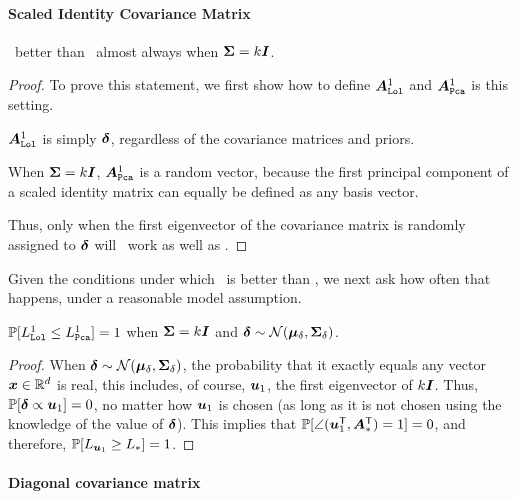 \documentclass[10pt]{article}
\begin{document}
\paragraph{Scaled Identity Covariance Matrix}


\begin{lem}
\Lol~better than \Pca~almost always when $\boldsymbol{\Sigma}=k \boldsymbol{I}$.
\end{lem}

\begin{proof}
To prove this statement, we first show how to define $\boldsymbol{A}_{{\sc \texttt{Lol}}}^1$ and $\boldsymbol{A}_{{\sc \texttt{Pca}}}^1$ is this setting.

\begin{compactitem}
\item $\boldsymbol{A}_{{\sc \texttt{Lol}}}^1$ is simply $\boldsymbol{\delta}$, regardless of the covariance matrices and priors.
\item When $\boldsymbol{\Sigma}=k \boldsymbol{I}$, $\boldsymbol{A}_{{\sc \texttt{Pca}}}^1$ is a random vector, because the first principal component of a scaled identity matrix can equally be defined as any basis vector.
\end{compactitem}

Thus, only when the first eigenvector of the covariance matrix is randomly assigned to $\boldsymbol{\delta}$ will \Pca~work as well as \Lol.
\end{proof}


Given the conditions under which \Lol~is better than \Pca, we next ask how often that happens, under a reasonable model assumption.

\begin{lem}
$\mathbb{P}[L_{{\sc \texttt{Lol}}}^1 \leq L_{{\sc \texttt{Pca}}}^1]=1$ when $\boldsymbol{\Sigma}=k \boldsymbol{I}$ and $\boldsymbol{\delta} \sim \mathcal{N}(\boldsymbol{\mu}_{\delta},\boldsymbol{\Sigma}_{\delta})$.
\end{lem}

\begin{proof}
When $\boldsymbol{\delta} \sim \mathcal{N}(\boldsymbol{\mu}_\delta,\boldsymbol{\Sigma}_\delta)$, the probability that it exactly equals any vector $\boldsymbol{x} \in \mathbb{R}^d$ is real, this includes, of course,  $\boldsymbol{u}_1$, the first eigenvector of $k \boldsymbol{I}$.  Thus, $\mathbb{P}[\boldsymbol{\delta} \propto \boldsymbol{u}_1]=0$, no matter how $\boldsymbol{u}_1$ is chosen (as long as it is not chosen using the knowledge of the value of $\boldsymbol{\delta}$).
This implies that $\mathbb{P}[\angle(\boldsymbol{u}_1^{\mathsf{T}},\boldsymbol{A}_*^{\mathsf{T}}) =1 ] = 0$, and therefore, $\mathbb{P}[L_{\boldsymbol{u}_1} \geq L_*] =1$.
\end{proof}


\paragraph{Diagonal covariance matrix}
\end{document}
